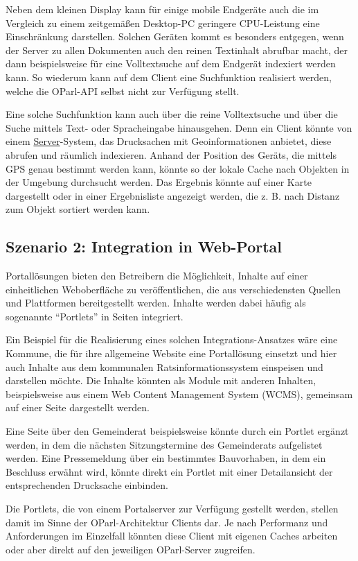 \documentclass[,a4paper]{article}
\begin{document}
Neben dem kleinen Display kann für einige mobile Endgeräte auch die im
Vergleich zu einem zeitgemäßen Desktop-PC geringere CPU-Leistung eine
Einschränkung darstellen. Solchen Geräten kommt es besonders entgegen,
wenn der Server zu allen Dokumenten auch den reinen Textinhalt abrufbar
macht, der dann beispielsweise für eine Volltextsuche auf dem Endgerät
indexiert werden kann. So wiederum kann auf dem Client eine Suchfunktion
realisiert werden, welche die OParl-API selbst nicht zur Verfügung
stellt.

Eine solche Suchfunktion kann auch über die reine Volltextsuche und über
die Suche mittels Text- oder Spracheingabe hinausgehen. Denn ein Client
könnte von einem \hyperref[server]{Server}-System, das Drucksachen mit
Geoinformationen anbietet, diese abrufen und räumlich indexieren. Anhand
der Position des Geräts, die mittels GPS genau bestimmt werden kann,
könnte so der lokale Cache nach Objekten in der Umgebung durchsucht
werden. Das Ergebnis könnte auf einer Karte dargestellt oder in einer
Ergebnisliste angezeigt werden, die z. B. nach Distanz zum Objekt
sortiert werden kann.

\subsection{Szenario 2: Integration in
Web-Portal}\label{szenarioux5fwebux5fportal}

Portallösungen bieten den Betreibern die Möglichkeit, Inhalte auf einer
einheitlichen Weboberfläche zu veröffentlichen, die aus verschiedensten
Quellen und Plattformen bereitgestellt werden. Inhalte werden dabei
häufig als sogenannte ``Portlets'' in Seiten integriert.

Ein Beispiel für die Realisierung eines solchen Integrations-Ansatzes
wäre eine Kommune, die für ihre allgemeine Website eine Portallösung
einsetzt und hier auch Inhalte aus dem kommunalen Ratsinformationssystem
einspeisen und darstellen möchte. Die Inhalte könnten als Module mit
anderen Inhalten, beispielsweise aus einem Web Content Management System
(WCMS), gemeinsam auf einer Seite dargestellt werden.

Eine Seite über den Gemeinderat beispielsweise könnte durch ein Portlet
ergänzt werden, in dem die nächsten Sitzungstermine des Gemeinderats
aufgelistet werden. Eine Pressemeldung über ein bestimmtes Bauvorhaben,
in dem ein Beschluss erwähnt wird, könnte direkt ein Portlet mit einer
Detailansicht der entsprechenden Drucksache einbinden.

Die Portlets, die von einem Portalserver zur Verfügung gestellt werden,
stellen damit im Sinne der OParl-Architektur Clients dar. Je nach
Performanz und Anforderungen im Einzelfall könnten diese Client mit
eigenen Caches arbeiten oder aber direkt auf den jeweiligen OParl-Server
zugreifen.
\end{document}
